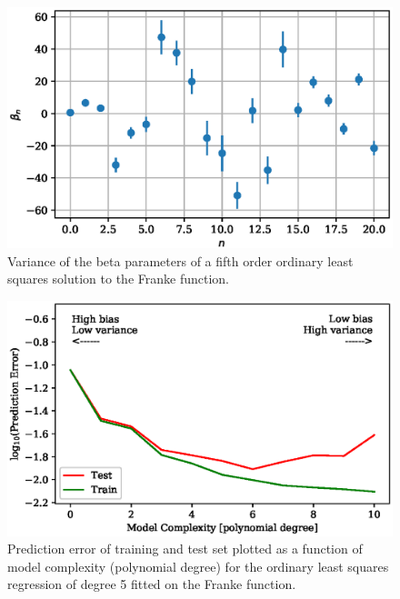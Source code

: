 \documentclass[a4paper, 10pt]{article}
\begin{document}
\begin{figure}[H]
    \includegraphics[scale=1]{figs/beta_variance_ols_Franke.eps}
    \caption{Variance of the beta parameters of a fifth order ordinary least squares solution to the Franke function.}
    \label{fig:beta_variance_Franke}
\end{figure}

\begin{figure}[H]
    \includegraphics[scale=1]{figs/biasvariancetradeoff_ols_Franke.eps}
    \caption{Prediction error of training and test set plotted as a function of model complexity (polynomial degree) for the ordinary least squares regression of degree 5 fitted on the Franke function.}
    \label{fig:bias_ols_Franke}
\end{figure}
\end{document}
